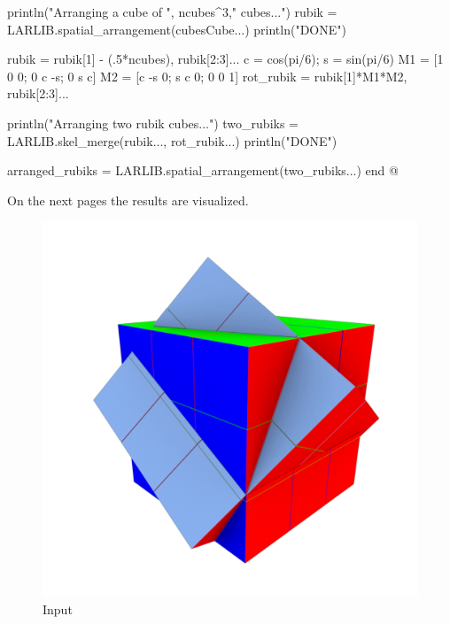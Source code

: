{    println("Arranging a cube of ", ncubes^3," cubes...")
    rubik = LARLIB.spatial_arrangement(cubesCube...)
    println("DONE")

    rubik = rubik[1] - (.5*ncubes), rubik[2:3]...
    c = cos(pi/6); s = sin(pi/6)
    M1 = [1  0 0; 0 c -s; 0 s c]
    M2 = [c -s 0; s c  0; 0 0 1]
    rot_rubik = rubik[1]*M1*M2, rubik[2:3]...

    println("Arranging two rubik cubes...")
    two_rubiks = LARLIB.skel_merge(rubik..., rot_rubik...)
    println("DONE")

    arranged_rubiks = LARLIB.spatial_arrangement(two_rubiks...)
end
@}

On the next pages the results are visualized.
\begin{figure}[h]
    \includegraphics[width=\textwidth]{./img/test-0.pdf}%
    \caption{Input}
\end{figure}

